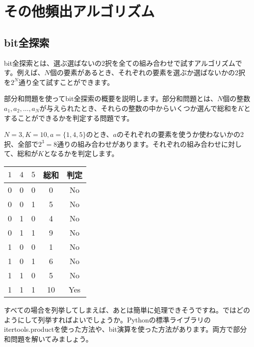\documentclass{jlreq}
\begin{document}
\section{その他頻出アルゴリズム}
\subsection{bit全探索}
bit全探索とは、選ぶ選ばないの2択を全ての組み合わせで試すアルゴリズムです。例えば、$N$個の要素があるとき、それぞれの要素を選ぶか選ばないかの2択を$2^N$通り全て試すことができます。

部分和問題を使ってbit全探索の概要を説明します。部分和問題とは、$N$個の整数$a_1, a_2, \ldots, a_N$が与えられたとき、それらの整数の中からいくつか選んで総和を$K$とすることができるかを判定する問題です。

$N = 3, K = 10, a = \{1, 4, 5\}$のとき、$a$のそれぞれの要素を使うか使わないかの2択、全部で$2^3 = 8$通りの組み合わせがあります。それぞれの組み合わせに対して、総和が$K$となるかを判定します。

\begin{table}[h]
  \centering
  \begin{tabular}{|c|c|c|c|c|}
    \hline
    $1$ & $4$ & $5$ & 総和 & 判定 \\
    \hline
    0 & 0 & 0 & 0 & No \\
    0 & 0 & 1 & 5 & No \\
    0 & 1 & 0 & 4 & No \\
    0 & 1 & 1 & 9 & No \\
    1 & 0 & 0 & 1 & No \\
    1 & 0 & 1 & 6 & No \\
    1 & 1 & 0 & 5 & No \\
    1 & 1 & 1 & 10 & Yes \\
    \hline
  \end{tabular}
\end{table}

すべての場合を列挙してしまえば、あとは簡単に処理できそうですね。ではどのようにして列挙すればよいでしょうか。Pythonの標準ライブラリの
itertools.productを使った方法や、bit演算を使った方法があります。両方で部分和問題を解いてみましょう。
\end{document}
